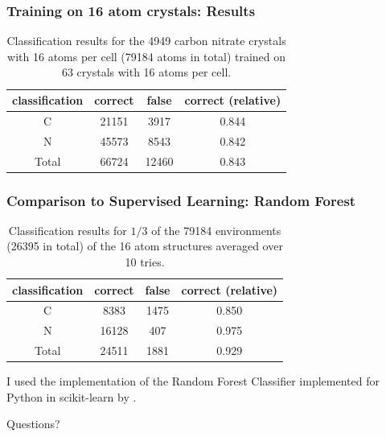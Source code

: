 \documentclass{beamer}
\begin{document}
\begin{frame}
  \frametitle{Training on 16 atom crystals: Results}
  \begin{table}[h!]
    \center
    \begin{tabular}{c|c|c|c}
      classification & correct & false & correct (relative) \\ \hline
      C              & 21151   & 3917  & 0.844              \\ \hline
      N              & 45573   & 8543  & 0.842              \\ \hline
      Total          & 66724   & 12460  & 0.843             
    \end{tabular}
    \caption{Classification results for the 4949 carbon nitrate crystals with 16 atoms per cell (79184 atoms in total) trained on 63 crystals with 16 atoms per cell.}
    \label{table:res2}
  \end{table}
\end{frame}

\begin{frame}
  \frametitle{Comparison to Supervised Learning: Random Forest}
  \begin{table}[h!]
\center
\begin{tabular}{c|c|c|c}
classification & correct & false & correct (relative) \\ \hline
C              & 8383   & 1475  & 0.850              \\ \hline
N              & 16128   & 407  & 0.975              \\ \hline
Total          & 24511   & 1881  & 0.929             
\end{tabular}
\caption{Classification results for $1/3$ of the 79184 environments (26395 in total) of the 16 atom structures averaged over 10 tries.}
\label{table:res3}
\end{table}
I used the implementation of the Random Forest Classifier implemented for Python in scikit-learn by \citeauthor{scikit} \cite{scikit}. 

\end{frame}

\begin{frame}
  \center
  \Huge
  Questions?

\end{frame}

































\begin{frame}
    \printbibliography[heading=bibintoc]

  \end{frame}
\end{document}
